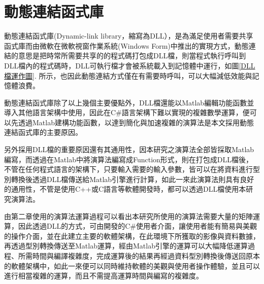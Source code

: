 \section{動態連結函式庫}
動態連結函式庫(Dynamic-link library，縮寫為DLL），是為滿足使用者需要共享函式庫而由微軟在微軟視窗作業系統(Windows Form)中推出的實現方式，動態連結的意思是把時常所需要共享的的程式碼打包成DLL檔\cite{DLL}，則當程式執行呼叫到DLL檔內的程式碼時，DLL可執行檔才會被系統載入到記憶體中運行，如圖\ref{DLL檔運作圖}. 所示，也因此動態連結方式僅在有需要時呼叫，可以大幅減低效能與記憶體浪費。\par
動態連結函式庫除了以上幾個主要優點外，DLL檔還能以Matlab編輯功能函數並導入其他語言架構中使用，因此在C\#語言架構下難以實現的複雜數學運算，便可以先透過Matlab建構功能函數，以達到簡化與加速複雜的演算法是本文採用動態連結函式庫的主要原因。\par
另外採用DLL檔的重要原因還有其通用性，因本研究之演算法全部皆採取Matlab編寫，而透過在Matlab中將演算法編寫成Function形式，則在打包成DLL檔後，不管在任何程式語言的架構下，只要輸入需要的輸入參數，皆可以在將資料進行型別轉換後透過DLL檔傳送給Matlab引擎進行計算，如此一來此演算法則具有良好的通用性，不管是使用C++或C語言等軟體開發時，都可以透過DLL檔使用本研究演算法。\par
由第二章使用的演算法運算過程可以看出本研究所使用的演算法需要大量的矩陣運算，因此透過DLL的方式，可由開發的C\#使用者介面，讓使用者能有簡易與美觀的操作介面，並在此建立主要的軟體架構，在此環境下所獲取的影像與資料數據，再透過型別轉換傳送至Matlab運算，經由Matlab引擎的運算可以大幅降低運算過程、所需時間與編譯複雜度，完成運算後的結果再經過資料型別轉換後傳送回原本的軟體架構中，如此一來便可以同時維持軟體的美觀與使用者操作體驗，並且可以進行相當複雜的運算，而且不需提高運算時間與編寫的複雜度。
